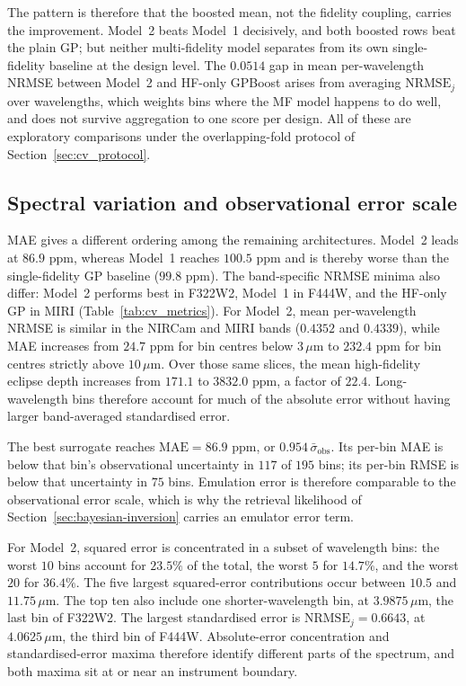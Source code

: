 \documentclass[12pt, letterpaper, oneside]{article}
\begin{document}
The pattern is therefore that the boosted mean, not the fidelity coupling,
carries the improvement. Model~2 beats Model~1 decisively, and both boosted
rows beat the plain GP; but neither multi-fidelity model separates from its
own single-fidelity baseline at the design level. The $0.0514$ gap in mean
per-wavelength NRMSE between Model~2 and HF-only GPBoost arises from averaging
$\mathrm{NRMSE}_j$ over wavelengths, which weights bins where the MF model
happens to do well, and does not survive aggregation to one score per design.
All of these are exploratory comparisons under the overlapping-fold protocol
of Section~\ref{sec:cv_protocol}.

\subsection{Spectral variation and observational error scale}

MAE gives a different ordering among the remaining architectures. Model~2
leads at $86.9$ ppm, whereas Model~1 reaches $100.5$ ppm and is thereby worse
than the single-fidelity GP baseline ($99.8$ ppm).
The band-specific NRMSE minima also differ: Model~2 performs best in
F322W2, Model~1 in F444W, and the HF-only GP in MIRI
(Table~\ref{tab:cv_metrics}).
For Model~2, mean per-wavelength NRMSE is similar in the NIRCam and MIRI bands
($0.4352$ and $0.4339$), while MAE increases from $24.7$ ppm for bin centres
below $3\,\mu$m to $232.4$ ppm for bin centres strictly above $10\,\mu$m.
Over those same slices, the mean high-fidelity eclipse depth increases from
$171.1$ to $3832.0$ ppm, a factor of $22.4$. Long-wavelength bins therefore
account for much of the absolute error without having larger band-averaged
standardised error.

The best surrogate reaches $\mathrm{MAE}=86.9$ ppm, or
$0.954\,\bar\sigma_{\mathrm{obs}}$. Its per-bin MAE is below that bin's
observational uncertainty in $117$ of $195$ bins; its per-bin RMSE is below
that uncertainty in $75$ bins. Emulation error is therefore comparable to the
observational error scale, which is why the retrieval likelihood of
Section~\ref{sec:bayesian-inversion} carries an emulator error term.

For Model~2, squared error is concentrated in a subset of wavelength bins: the
worst $10$ bins account for $23.5\%$ of the total, the worst $5$ for $14.7\%$,
and the worst $20$ for $36.4\%$. The five largest squared-error contributions
occur between $10.5$ and $11.75\,\mu$m. The top ten also include one
shorter-wavelength bin, at $3.9875\,\mu$m, the last bin of F322W2. The largest
standardised error is $\mathrm{NRMSE}_j=0.6643$, at $4.0625\,\mu$m, the third
bin of F444W. Absolute-error concentration and standardised-error maxima
therefore identify different parts of the spectrum, and both maxima sit at or
near an instrument boundary.
\end{document}
